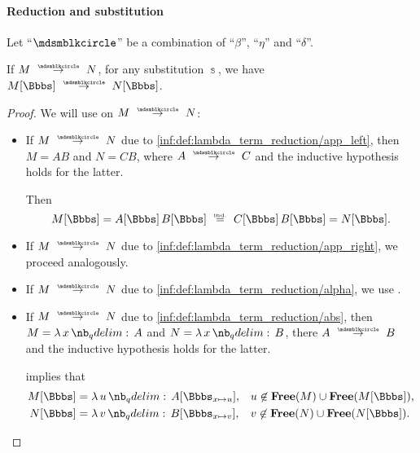 \paragraph{Reduction and substitution}

\begin{proposition}\label{thm:substitution_on_single_step_reduction}
  Let \enquote{\( {\Anon} \)} be a combination of \enquote{\( \beta \)}, \enquote{\( \eta \)} and \enquote{\( \delta \)}.

  If \( M \pred N \), for any substitution \( \Bbbs \), we have \( M[\Bbbs] \pred N[\Bbbs] \).
\end{proposition}
\begin{proof}
  We will use  on \( M \pred N \):
  \begin{itemize}
    \item If \( M \pred N \) due to \ref{inf:def:lambda_term_reduction/app_left}, then \( M = AB \) and \( N = CB \), where \( A \pred C \) and the inductive hypothesis holds for the latter.

    Then
    \begin{equation*}
      M[\Bbbs]
      =
      A[\Bbbs] \thinspace B[\Bbbs]
      \reloset{\T{ind.}} =
      C[\Bbbs] \thinspace B[\Bbbs]
      =
      N[\Bbbs].
    \end{equation*}

    \item If \( M \pred N \) due to \ref{inf:def:lambda_term_reduction/app_right}, we proceed analogously.

    \item If \( M \pred N \) due to \ref{inf:def:lambda_term_reduction/alpha}, we use .

    \item If \( M \pred N \) due to \ref{inf:def:lambda_term_reduction/abs}, then \( M = \qabs x A \) and \( N = \qabs x B \), there \( A \pred B \) and the inductive hypothesis holds for the latter.

     implies that
    \begin{align*}
      M[\Bbbs] &= \qabs u A[\Bbbs_{x \mapsto u}], &&u \not\in \op*{Free}(M) \cup \op*{Free}(M[\Bbbs]), \\
      N[\Bbbs] &= \qabs v B[\Bbbs_{x \mapsto v}], &&v \not\in \op*{Free}(N) \cup \op*{Free}(N[\Bbbs]).
    \end{align*}


\end{itemize}
\end{proof}

